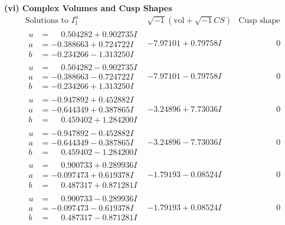 \documentclass[1p]{elsarticle_modified}
\theoremstyle{definition}
\newcommand{\I}{\sqrt{-1}}
\begin{document}
\newpage\flushleft \textbf{(vi) Complex Volumes and Cusp Shapes}
$$\begin{array}{c|c|c}  
\text{Solutions to }I^u_{1}& \I (\text{vol} + \sqrt{-1}CS) & \text{Cusp shape}\\
 \hline 
\begin{aligned}
u &= \phantom{-}0.504282 + 0.902735 I \\
a &= -0.388663 + 0.724722 I \\
b &= -0.234266 - 1.313250 I\end{aligned}
 & -7.97101 + 0.79758 I & \phantom{-0.000000 } 0 \\ \hline\begin{aligned}
u &= \phantom{-}0.504282 - 0.902735 I \\
a &= -0.388663 - 0.724722 I \\
b &= -0.234266 + 1.313250 I\end{aligned}
 & -7.97101 - 0.79758 I & \phantom{-0.000000 } 0 \\ \hline\begin{aligned}
u &= -0.947892 + 0.452882 I \\
a &= -0.644349 + 0.387865 I \\
b &= \phantom{-}0.459402 + 1.284200 I\end{aligned}
 & -3.24896 + 7.73036 I & \phantom{-0.000000 } 0 \\ \hline\begin{aligned}
u &= -0.947892 - 0.452882 I \\
a &= -0.644349 - 0.387865 I \\
b &= \phantom{-}0.459402 - 1.284200 I\end{aligned}
 & -3.24896 - 7.73036 I & \phantom{-0.000000 } 0 \\ \hline\begin{aligned}
u &= \phantom{-}0.900733 + 0.289936 I \\
a &= -0.097473 + 0.619378 I \\
b &= \phantom{-}0.487317 + 0.871281 I\end{aligned}
 & -1.79193 - 0.08524 I & \phantom{-0.000000 } 0 \\ \hline\begin{aligned}
u &= \phantom{-}0.900733 - 0.289936 I \\
a &= -0.097473 - 0.619378 I \\
b &= \phantom{-}0.487317 - 0.871281 I\end{aligned}
 & -1.79193 + 0.08524 I & \phantom{-0.000000 } 0 \\ \hline\begin{aligned}

\end{aligned}
\end{array}$$
\end{document}
